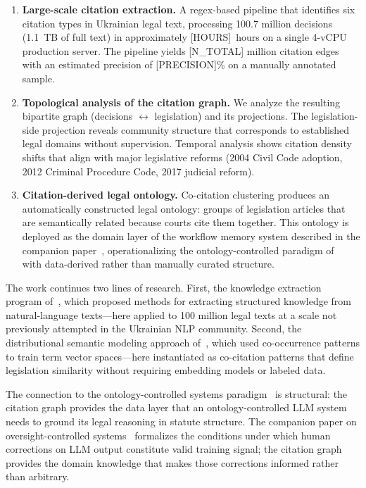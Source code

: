 \documentclass[11pt]{article}
\begin{document}
\begin{enumerate}[leftmargin=*, nosep]
  \item \textbf{Large-scale citation extraction.} A regex-based pipeline that identifies six citation types in Ukrainian legal text, processing 100.7 million decisions (1.1~TB of full text) in approximately [HOURS]~hours on a single 4-vCPU production server. The pipeline yields [N\_TOTAL] million citation edges with an estimated precision of [PRECISION]\% on a manually annotated sample.

  \item \textbf{Topological analysis of the citation graph.} We analyze the resulting bipartite graph (decisions $\leftrightarrow$ legislation) and its projections. The legislation-side projection reveals community structure that corresponds to established legal domains without supervision. Temporal analysis shows citation density shifts that align with major legislative reforms (2004 Civil Code adoption, 2012 Criminal Procedure Code, 2017 judicial reform).

  \item \textbf{Citation-derived legal ontology.} Co-citation clustering produces an automatically constructed legal ontology: groups of legislation articles that are semantically related because courts cite them together. This ontology is deployed as the domain layer of the workflow memory system described in the companion paper~\citep{ovcharov2026workflowmemory}, operationalizing the ontology-controlled paradigm of~\citet{palagin2006architecture} with data-derived rather than manually curated structure.
\end{enumerate}

The work continues two lines of research.
First, the knowledge extraction program of~\citet{palagin2012knowledge}, which proposed methods for extracting structured knowledge from natural-language texts---here applied to 100 million legal texts at a scale not previously attempted in the Ukrainian NLP community.
Second, the distributional semantic modeling approach of~\citet{palagin2020distributional}, which used co-occurrence patterns to train term vector spaces---here instantiated as co-citation patterns that define legislation similarity without requiring embedding models or labeled data.

The connection to the ontology-controlled systems paradigm~\citep{palagin2006architecture,palagin2023ontochatgpt} is structural: the citation graph provides the data layer that an ontology-controlled LLM system needs to ground its legal reasoning in statute structure.
The companion paper on oversight-controlled systems~\citep{ovcharov2026bridge} formalizes the conditions under which human corrections on LLM output constitute valid training signal; the citation graph provides the domain knowledge that makes those corrections informed rather than arbitrary.
\end{document}
